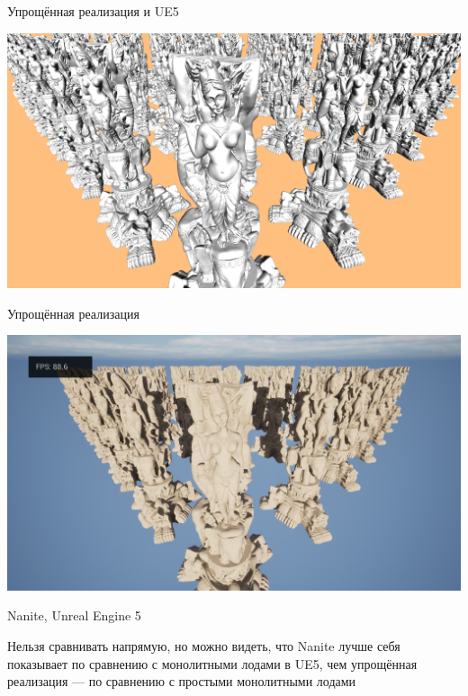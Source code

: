 \begin{frame}{Упрощённая реализация и UE5}
    \begin{minipage}{.45\textwidth}
        \centering
        \includegraphics[width=\textwidth]{../Text/pics/comparison-cluster.png}

        Упрощённая реализация
    \end{minipage}
    \begin{minipage}{.45\textwidth}
        \centering
        \includegraphics[width=\textwidth]{pics/ue5-nanite.png}

        Nanite, Unreal Engine 5
    \end{minipage}

    \bigskip

    Нельзя сравнивать напрямую, но можно видеть, что Nanite лучше себя показывает по сравнению с монолитными лодами в UE5, чем упрощённая реализация --- по сравнению с простыми монолитными лодами
\end{frame}


